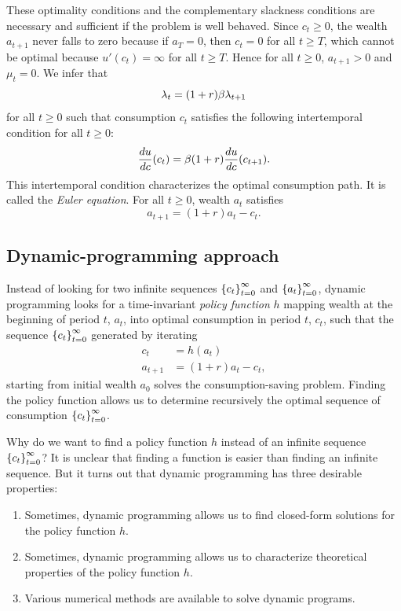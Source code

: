 \documentclass[letterpaper, 11pt, leqno]{article}
\begin{document}
These optimality conditions and the complementary slackness conditions are necessary and sufficient if the problem is well behaved. Since $c_{t}\ge 0$, the wealth $a_{t+1}$ never falls to zero because if $a_{T}=0$, then $c_{t}=0$ for all $t\ge T$, which cannot be optimal because $u'(c_{t})=\infty$ for all $t\ge T$. Hence for all $t\ge 0$, $a_{t+1}>0$ and $\mu_{t}=0$. We infer that 
\begin{equation*}
\lambda_t=(1+r) \beta \lambda_{t+1}
\end{equation*}
for all $t\ge 0$ such that consumption $c_{t}$ satisfies the following intertemporal condition for all $t\ge 0$:
\begin{align}
\od{u}{c}(c_{t})= \b (1+r) \od{u}{c}(c_{t+1}).\label{e:eulerdp}
\end{align}
This intertemporal condition characterizes the optimal consumption path. It is called the \textit{Euler equation}. For all $t\ge 0$, wealth $a_{t}$ satisfies
\begin{equation*}
a_{t+1}=(1+r) a_{t}-c_{t}.
\end{equation*}

\subsection{Dynamic-programming approach}

Instead of looking for two infinite sequences $\left\lbrace c_t \right\rbrace_{t=0}^{\infty}$ and $\left\lbrace a_t \right\rbrace_{t=0}^{\infty}$, dynamic programming looks for a time-invariant \textit{policy function} $h$ mapping wealth at the beginning of period $t$, $a_t$, into optimal consumption in period $t$, $c_t$, such that the sequence $\left\lbrace c_t \right\rbrace_{t=0}^{\infty}$ generated by iterating
\begin{align}
c_t&=h(a_t)\label{e:iter1}\\
a_{t+1}&=(1+r) a_t-c_t,\label{e:iter2}
\end{align}
starting from initial wealth $a_0$ solves the consumption-saving problem. Finding the policy function allows us to determine recursively the optimal sequence of consumption $\left\lbrace c_t \right\rbrace_{t=0}^{\infty}$.

Why do we want to find a policy function $h$ instead of an infinite sequence $\left\lbrace c_t \right\rbrace_{t=0}^{\infty}$? It is unclear that finding a function is easier than finding an infinite sequence. But it turns out that dynamic programming has three desirable properties:
\begin{enumerate}
\item Sometimes, dynamic programming allows us to find closed-form solutions for the policy function $h$.
\item Sometimes, dynamic programming allows us to characterize theoretical properties of the policy function $h$.
\item Various numerical methods are available to solve dynamic programs.
\end{enumerate}
\end{document}
